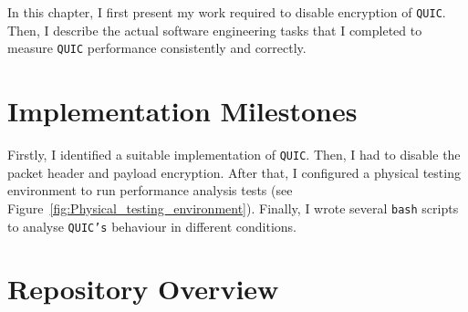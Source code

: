 \documentclass[12pt,a4paper]{report}
\begin{document}





In this chapter, I first present my work required to disable encryption of \texttt{QUIC}.
Then, I describe the actual software engineering tasks that I completed to measure \texttt{QUIC} performance consistently and correctly.


\section{Implementation Milestones}
Firstly, I identified a suitable implementation of \texttt{QUIC}.
Then, I had to disable the packet header and payload encryption.
After that, I configured a physical testing environment to run performance analysis tests (see Figure~\ref{fig:Physical_testing_environment}).
Finally, I wrote several \texttt{bash} scripts to analyse \texttt{QUIC's} behaviour in different conditions. 

\section{Repository Overview} 
\end{document}

